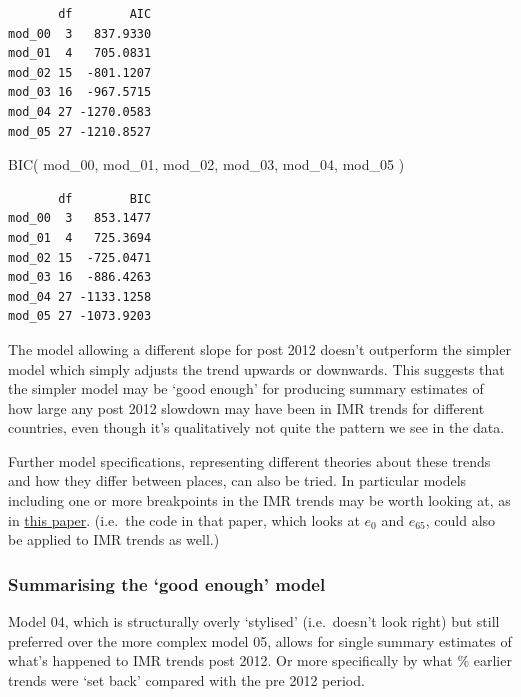 \documentclass[
  letterpaper,
  DIV=11,
  numbers=noendperiod]{scrartcl}
\newenvironment{Shaded}{\begin{snugshade}}{\end{snugshade}}
\newcommand{\FunctionTok}[1]{\textcolor[rgb]{0.28,0.35,0.67}{#1}}
\newcommand{\NormalTok}[1]{\textcolor[rgb]{0.00,0.23,0.31}{#1}}
\begin{document}
\begin{verbatim}
       df        AIC
mod_00  3   837.9330
mod_01  4   705.0831
mod_02 15  -801.1207
mod_03 16  -967.5715
mod_04 27 -1270.0583
mod_05 27 -1210.8527
\end{verbatim}

\begin{Shaded}
\begin{Highlighting}[]
\FunctionTok{BIC}\NormalTok{(}
\NormalTok{  mod\_00, mod\_01, mod\_02, mod\_03, mod\_04, mod\_05}
\NormalTok{)}
\end{Highlighting}
\end{Shaded}

\begin{verbatim}
       df        BIC
mod_00  3   853.1477
mod_01  4   725.3694
mod_02 15  -725.0471
mod_03 16  -886.4263
mod_04 27 -1133.1258
mod_05 27 -1073.9203
\end{verbatim}

The model allowing a different slope for post 2012 doesn't outperform
the simpler model which simply adjusts the trend upwards or downwards.
This suggests that the simpler model may be `good enough' for producing
summary estimates of how large any post 2012 slowdown may have been in
IMR trends for different countries, even though it's qualitatively not
quite the pattern we see in the data.

Further model specifications, representing different theories about
these trends and how they differ between places, can also be tried. In
particular models including one or more breakpoints in the IMR trends
may be worth looking at, as in
\href{https://www.dannydorling.org/wp-content/files/dannydorling_publication_id9575.pdf}{this
paper}. (i.e.~the code in that paper, which looks at \(e_0\) and
\(e_{65}\), could also be applied to IMR trends as well.)

\hypertarget{summarising-the-good-enough-model}{%
\subsubsection{Summarising the `good enough'
model}\label{summarising-the-good-enough-model}}

Model 04, which is structurally overly `stylised' (i.e.~doesn't look
right) but still preferred over the more complex model 05, allows for
single summary estimates of what's happened to IMR trends post 2012. Or
more specifically by what \% earlier trends were `set back' compared
with the pre 2012 period.
\end{document}
